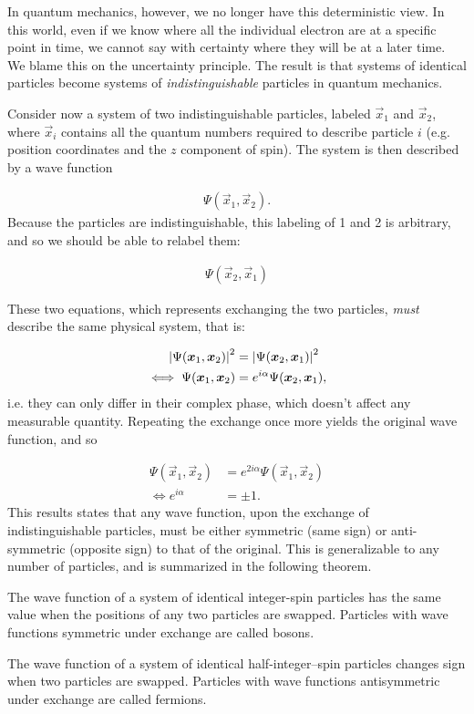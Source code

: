 \documentclass[Thesis.tex]{subfiles}
\begin{document}
In quantum mechanics, however, we no longer have this deterministic view. In
this world, even if we know where all the individual electron are at a specific
point in time, we cannot say with certainty where they will be at a later
time. We blame this on the uncertainty principle. The result is that systems of
identical particles become systems of \emph{indistinguishable} particles in
quantum mechanics.

Consider now a system of two indistinguishable particles, labeled $\vec x_1$ and
$\vec x_2$, where $\vec x_i$ contains all the quantum numbers required to describe
particle $i$ (e.g. position coordinates and the $z$ component of spin). The
system is then described by a wave function

\begin{align}
    \Psi(\vec x_1, \vec x_2).
\end{align}
Because the particles are indistinguishable, this labeling of 1 and 2 is
arbitrary, and so we should be able to relabel them:

\begin{align}
    \Psi(\vec x_2, \vec x_1)
\end{align}

These two equations, which represents exchanging the two particles, \emph{must}
describe the same physical system, that is:

\begin{align}
    \abs{\Psi(\bm{x}_1, \bm{x}_2)}^2 &= \abs{\Psi(\bm{x}_2, \bm{x}_1)}^2\\
    \iff \Psi(\bm{x}_1,\bm{x}_2) &= e^{i\alpha}\Psi(\bm{x}_2, \bm{x}_1),
\end{align}
i.e. they can only differ in their complex phase, which doesn't affect any measurable
quantity. Repeating the exchange once more yields the original wave function, and so

\begin{align}
    \Psi(\vec x_1,\vec x_2) &= e^{2i\alpha}\Psi(\vec x_1, \vec x_2)\\
    \iff e^{i\alpha} &= \pm 1.
\end{align}
This results states that any wave function, upon the exchange of
indistinguishable particles, must be either symmetric (same sign) or
anti-symmetric (opposite sign) to that of the original. This is generalizable to
any number of particles, and is summarized in the following theorem.

\begin{theorem}\label{theorem:spin-statistic}

    The wave function of a system of identical integer-spin particles has the same value
    when the positions of any two particles are swapped. Particles with wave functions
    symmetric under exchange are called bosons.

    The wave function of a system of identical half-integer–spin particles changes sign
    when two particles are swapped. Particles with wave functions antisymmetric under
    exchange are called fermions.
\end{theorem}
\end{document}

